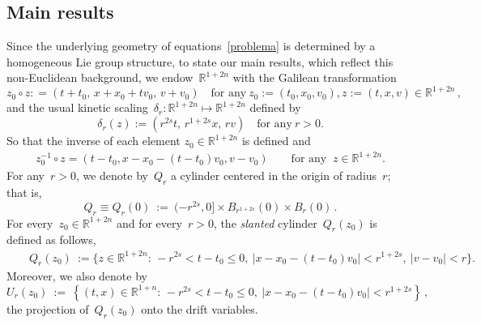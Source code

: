 \documentclass[leqno,10pt]{amsart}
\theoremstyle{plain}
\theoremstyle{remark}
\numberwithin{equation}{section}
\def\er{\mathbb{R}}
\newcommand{\snr}[1]{\lvert #1\rvert}
\begin{document}
\subsection{Main results} {Since the underlying geometry of equations~\eqref{problema} is determined by a homogeneous Lie group structure, to state our main results, which reflect this non-Euclidean background, we endow~$\er^{1+2n}$ with the Galilean transformation
\begin{equation} \label{def:action}
	z_{0} \circ z : = (t+t_{0},\, x+x_{0}+tv_{0}, \, v+v_{0}) \quad 
	\text{for any}~z_{0}:=(t_0,x_0,v_0), z:=(t,x,v) \in \mathbb{R}^{1+2n}\,,
\end{equation}
and the usual kinetic scaling~$\delta_r:  \er^{1+2n} \mapsto \er^{1+2n}$ defined by
\begin{equation} \label{def:dil} 
	\delta_r (z):=(r^{2s}t,\,r^{1+2s}x,\, r v) \quad \text{for any}~r > 0. 
\end{equation} 
So that the inverse of each element $z_0 \in \mathbb{R}^{1+2n}$ is defined and 
\begin{align*}
	z_{0}^{-1} \circ z = ( t- t_{0}, x - x_{0} - (t-t_{0}) v_{0}, v-v_{0}) \qquad \text{for any }~z \in \mathbb{R}^{1+2n}.
\end{align*}
For any~$r>0$, we denote by~${Q}_r$ a cylinder centered in the origin of radius~$r$; that is,
$$
{Q}_r \equiv {Q}_r({0}) \ :=  \  (-r^{2s},0]\times B_{r^{1+2s}}(0)\times B_r(0)\,.
$$ 
For every~$z_{0} \in \er^{1+2n}$ and for every~$r>0$, the {\it slanted} cylinder~${Q}_r(z_{0})$ is defined as follows,
\begin{eqnarray}
	\label{Q-classico}
	&& {Q}_r(z_{0})\!\!\! \ :=
	\big \{ z \in \er^{1+2n}: \, -r^{2s} < t -  t_{0} \leq  0 ,  \ | x - x_{0} - (t - t_{0}) v_{0}| <r^{1 + 2s},\ \snr{ v- v_{0} } < r \big\}. 
\end{eqnarray}
Moreover,  we also denote by
$$
U_r(z_0) \ := \
\left\{(t,x)\in\er^{1+n}:\,-r^{2s}<t-t_0\leq0,\ 
|x-x_0-(t-t_0)v_0|<r^{1+2s}\right\}\,,
$$
the projection of~$Q_r(z_0)$ onto the drift variables.

}
\end{document}
